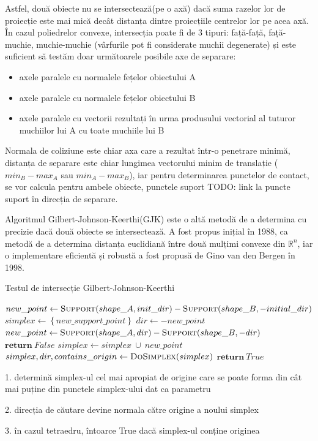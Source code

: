 \documentclass[12pt,a4paper]{report}
\begin{document}
Astfel, două obiecte nu se intersectează(pe o axă) dacă suma razelor lor de proiecție este mai mică decât distanța dintre proiecțiile centrelor lor pe acea axă. În cazul poliedrelor convexe, intersecția poate fi de 3 tipuri: față-față, față-muchie, muchie-muchie (vârfurile pot fi considerate muchii degenerate) și este suficient să testăm doar următoarele posibile axe de separare:
\begin{itemize}
	\item axele paralele cu normalele fețelor obiectului A
	\item axele paralele cu normalele fețelor obiectului B
	\item axele paralele cu vectorii rezultați în urma produsului vectorial al tuturor muchiilor lui A cu toate muchiile lui B
\end{itemize}
Normala de coliziune este chiar axa care a rezultat într-o penetrare minimă, distanța de separare este chiar lungimea vectorului minim de translație ($min_B - max_A$ sau $min_A - max_B$), iar pentru determinarea punctelor de contact, se vor calcula pentru ambele obiecte, punctele suport TODO: link la puncte suport în direcția de separare.


Algoritmul Gilbert-Johnson-Keerthi(GJK) este o altă metodă de a determina cu precizie dacă două obiecte se intersectează. A fost propus inițial în 1988\cite{gjk_original}, ca metodă de a determina distanța euclidiană între două mulțimi convexe din $\mathbb{R}^n$, iar o implementare eficientă și robustă a fost propusă de Gino van den Bergen în 1998\cite{gjk_gino}.
\begin{algorithm}[H]
	\footnotesize
	\linespread{1.0}\selectfont
	\caption{Testul de intersecție Gilbert-Johnson-Keerthi}
	\label{gjk_intersection_test}
	\begin{algorithmic}[0]
			\State $new\_point \gets \textproc{Support}(shape\_A, init\_dir) - \textproc{Support}(shape\_B, -initial\_dir)$
			\State $simplex \gets \left\lbrace new\_support\_point \right\rbrace $
			\State $dir \gets -new\_point$
			\Loop
				\State $new\_point \gets \textproc{Support}(shape\_A, dir) - \textproc{Support}(shape\_B, -dir)$
					\State $\textbf{return}\ False$
				\EndIf
				\State $simplex \gets simplex\ \cup\ new\_point $
				\State $simplex, dir, contains\_origin \gets \textproc{DoSimplex}(simplex) $
					\State $\textbf{return}\ True$
				\EndIf
			\EndLoop
		\EndFunction
		\Statex
			
			1. determină simplex-ul cel mai apropiat de origine care se poate forma din cât mai puține din punctele simplex-ului dat ca parametru
			
			2. direcția de căutare devine normala către origine a noului simplex
			
			3. în cazul tetraedru, întoarce True dacă simplex-ul conține originea
		\EndFunction
	\end{algorithmic}
\end{algorithm}
\end{document}
